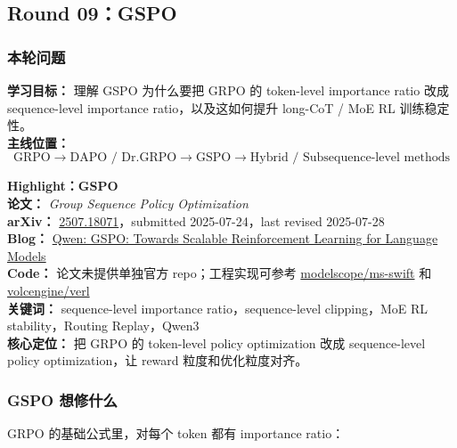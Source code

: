 
\subsection{Round 09：GSPO}

\subsubsection{本轮问题}

\begin{conceptbox}
\textbf{学习目标：} 理解 GSPO 为什么要把 GRPO 的 token-level importance ratio 改成 sequence-level importance ratio，以及这如何提升 long-CoT / MoE RL 训练稳定性。\\
\textbf{主线位置：}
\[
\text{GRPO}
\to
\text{DAPO / Dr.GRPO}
\to
\text{GSPO}
\to
\text{Hybrid / Subsequence-level methods}
\]
\end{conceptbox}

\begin{conceptbox}
\textbf{Highlight：GSPO}\\
\textbf{论文：} \emph{Group Sequence Policy Optimization}\\
\textbf{arXiv：} \href{https://arxiv.org/abs/2507.18071}{2507.18071}，submitted 2025-07-24，last revised 2025-07-28\\
\textbf{Blog：} \href{https://qwenlm.github.io/blog/gspo/}{Qwen: GSPO: Towards Scalable Reinforcement Learning for Language Models}\\
\textbf{Code：} 论文未提供单独官方 repo；工程实现可参考 \href{https://github.com/modelscope/ms-swift}{modelscope/ms-swift} 和 \href{https://github.com/volcengine/verl}{volcengine/verl}\\
\textbf{关键词：} sequence-level importance ratio，sequence-level clipping，MoE RL stability，Routing Replay，Qwen3\\
\textbf{核心定位：} 把 GRPO 的 token-level policy optimization 改成 sequence-level policy optimization，让 reward 粒度和优化粒度对齐。
\end{conceptbox}

\subsubsection{GSPO 想修什么}

GRPO 的基础公式里，对每个 token 都有 importance ratio：

